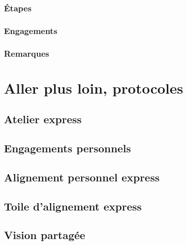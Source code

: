 \documentclass{book}
\begin{document}
\subsection{Étapes}
\subsection{Engagements}
\subsection{Remarques}

\chapter{Aller plus loin, protocoles} \label{aller-plus-loin}

\section{Atelier express} \label{atelier-express}
\section{Engagements personnels} \label{engagements-personnels}
\section{Alignement personnel express} \label{alignement-personnel-express}
\section{Toile d'alignement express} \label{toile-alignement-express}
\section{Vision partagée} \label{vision-partagee}
\end{document}
